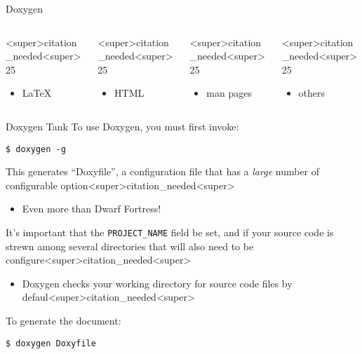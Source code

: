 \documentclass[11pt]{beamer}
\begin{document}
\begin{frame}[fragile=singleslide]{Doxygen}
\begin{itemize}
\end{itemize}
\vspace{-1em}
\begin{columns}
\begin{column}{<super>citation_needed<super>25\textwidth}
\begin{itemize}
\item \LaTeX
\end{itemize}
\end{column}
\begin{column}{<super>citation_needed<super>25\textwidth}
\begin{itemize}
\item HTML
\end{itemize}
\end{column}
\begin{column}{<super>citation_needed<super>25\textwidth}
\begin{itemize}
\item man pages
\end{itemize}
\end{column}
\begin{column}{<super>citation_needed<super>25\textwidth}
\begin{itemize}
\item others
\end{itemize}
\end{column}
\end{columns}
\end{frame}

\begin{frame}[fragile=singleslide]{Doxygen Tank}
To use Doxygen, you must first invoke:
\begin{lstlisting}[style=terminal]
$ doxygen -g
\end{lstlisting}
This generates ``Doxyfile'', a configuration file that has a \emph{large} number of configurable option<super>citation_needed<super>  
\begin{itemize}
\item Even more than Dwarf Fortress! 
\end{itemize}
It's important that the \texttt{PROJECT\_NAME} field be set, and if your source code is strewn among several directories that will also need to be configure<super>citation_needed<super>
\begin{itemize}
\item Doxygen checks your working directory for source code files by defaul<super>citation_needed<super>
\end{itemize}
To generate the document: 
\begin{lstlisting}[style=terminal]
$ doxygen Doxyfile
\end{lstlisting}
\end{frame}
\end{document}
